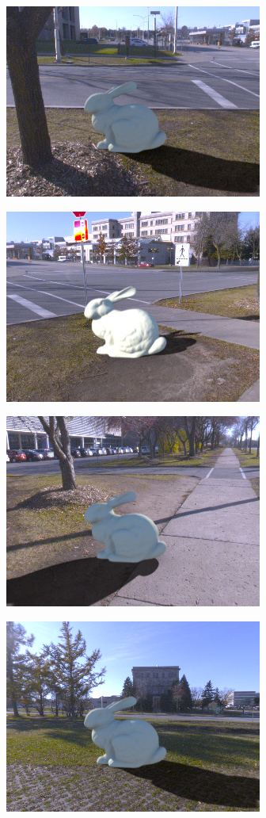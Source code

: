\begin{minipage}{\linewidth}
\begin{multicols}{4}
\includegraphics[width=\mywidth]{AG8A2875_Panorama_hdr-corrected_012.jpg}

\includegraphics[width=\mywidth]{AG8A2875_Panorama_hdr-corrected_006.jpg}

\includegraphics[width=\mywidth]{AG8A2875_Panorama_hdr-corrected_010.jpg}

\includegraphics[width=\mywidth]{AG8A2917_Panorama_hdr-corrected_008.jpg}


\end{multicols}
\end{minipage}
